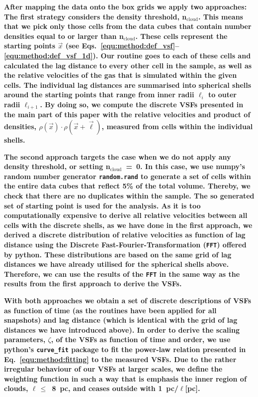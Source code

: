 \textbf{
    After mapping the data onto the box grids we apply two approaches: 
    The first strategy considers the density threshold, n$_\mathrm{cloud}$.
    This means that we pick only those cells from the data cubes that contain number densities equal to or larger than n$_\mathrm{cloud}$.
    These cells represent the starting points $\vec{x}$ (see Eqs.~\ref{equ:method:def_vsf}--\ref{equ:method:def_vsf_1d}).
    Our routine goes to each of these cells and calculated the lag distance to every other cell in the sample, as well as the relative velocities of the gas that is simulated within the given cells. 
    The individual lag distances are summarised into spherical shells around the starting points that range from inner radii $\ell_{i}$ to outer radii $\ell_{i+1}$. 
    By doing so, we compute the discrete VSFs presented in the main part of this paper with the relative velocities and product of densities, $\rho(\vec{x}) \cdot \rho(\vec{x}+\vec{\ell})$, measured from cells within the individual shells.
}

\textbf{
    The second approach targets the case when we do not apply any density threshold, or setting n$_\mathrm{cloud}$~=~0.
    In this case, we use numpy's random number generator \texttt{random.rand} to generate a set of cells within the entire data cubes that reflect 5\% of the total volume. 
    Thereby, we check that there are no duplicates within the sample.
    The so generated set of starting point is used for the analysis.
    As it is too computationally expensive to derive all relative velocities between all cells with the discrete shells, as we have done in the first approach, we derived a discrete distribution of relative velocities as function of lag distance using the Discrete Fast-Fourier-Transformation (\texttt{FFT}) offered by python.
    These distributions are based on the same grid of lag distances we have already utilised for the spherical shells above.
    Therefore, we can use the results of the \texttt{FFT} in the same way as the results from the first approach to derive the VSFs.
}

\textbf{
    With both approaches we obtain a set of discrete descriptions of VSFs as function of time (as the routines have been applied for all snapshots) and lag distance (which is identical with the grid of lag distances we have introduced above).
    In order to derive the scaling parameters, $\zeta$, of the VSFs as function of time and order, we use python's \texttt{curve\_fit} package to fit the power-law relation presented in Eq.~\ref{equ:method:fitting} to the measured VSFs.
    Due to the rather irregular behaviour of our VSFs at larger scales, we define the weighting function in such a way that is emphasis the inner region of clouds, $\ell\,\leq$~8~pc, and ceases outside with 1~pc/$\ell$[pc]. 
}

